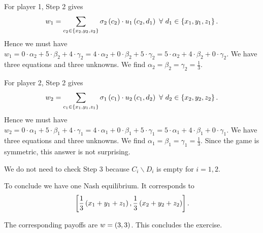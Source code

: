 \begin{enumerate} [label=\Alph*. ]
For player 1, Step 2 gives
\begin{equation*}
    w_1 = \sum_{c_2 \in \left\{x_2, y_2, z_2\right\}} \sigma_{2} \left(c_2\right) \cdot u_1 \left(c_2, d_1\right) \ \forall \ d_1 \in \left\{x_1, y_1, z_1\right\}.
\end{equation*}
Hence we must have $w_1 = 0 \cdot \alpha_2 + 5 \cdot \beta_2 + 4 \cdot \gamma_2
= 4 \cdot \alpha_2 + 0 \cdot \beta_2 + 5 \cdot \gamma_2
= 5 \cdot \alpha_2 + 4 \cdot \beta_2 + 0 \cdot \gamma_2$. We have three equations and three unknowns. We find $\alpha_2 = \beta_2 = \gamma_2 = \frac{1}{3}$.

For player 2, Step 2 gives
\begin{equation*}
    w_2 = \sum_{c_1 \in \left\{x_1, y_1, z_1\right\}} \sigma_{1} \left(c_1\right) \cdot u_2 \left(c_1, d_2\right) \ \forall \ d_2 \in \left\{x_2, y_2, z_2\right\}.
\end{equation*}
Hence we must have $w_2 = 0 \cdot \alpha_1 + 5 \cdot \beta_1 + 4 \cdot \gamma_1
= 4 \cdot \alpha_1 + 0 \cdot \beta_1 + 5 \cdot \gamma_1
= 5 \cdot \alpha_1 + 4 \cdot \beta_1 + 0 \cdot \gamma_1$. We have three equations and three unknowns. We find $\alpha_1 = \beta_1 = \gamma_1 = \frac{1}{3}$. Since the game is symmetric, this answer is not surprising. 

We do not need to check Step 3 because $C_{i} \backslash D_{i}$ is empty for $i = 1, 2$.
\end{enumerate}



To conclude we have one Nash equilibrium. It corresponds to
\begin{equation*}
    \left[\dfrac{1}{3} \left(x_1 + y_1 + z_1\right), \dfrac{1}{3} \left(x_2 + y_2 + z_2\right)\right].    
\end{equation*}

The corresponding payoffs are $w = \left(3,3\right)$. This concludes the exercise.